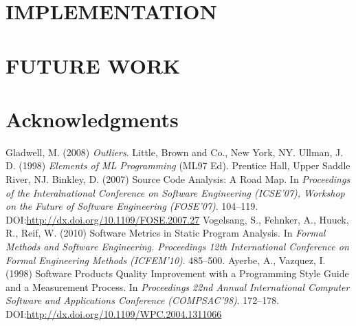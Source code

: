 \documentclass[12pt,abstracton]{scrartcl}
\begin{document}
\section{IMPLEMENTATION}\label{sec:impl}
\section{FUTURE WORK}\label{sec:future}
\section*{Acknowledgments}
\begin{thebibliography}{99}
 Gladwell, M. (2008) \emph{Outliers}. Little, Brown and Co., New York, NY.
 Ullman, J.\,D. (1998) \emph{Elements of ML Programming} (ML97 Ed). Prentice Hall, Upper Saddle River, NJ.
 Binkley, D. (2007) Source Code Analysis: A Road Map. In \emph{Proceedings of the Interalnational Conference on Software Engineering (ICSE'07), Workshop on the Future of Software Engineering (FOSE'07)}. 104--119. DOI:\url{http://dx.doi.org/10.1109/FOSE.2007.27}
 Vogelsang, S., Fehnker, A., Huuck, R., Reif, W. (2010) Software Metrics in Static Program Analysis. In \emph{Formal Methods and Software Engineering. Proceedings 12th International Conference on Formal Engineering Methods (ICFEM'10)}. 485--500.
 Ayerbe, A., Vazquez, I. (1998) Software Products Quality Improvement with a Programming Style Guide and a Measurement Process. In \emph{Proceedings
22nd Annual International Computer Software and Applications Conference (COMPSAC'98)}. 172--178. DOI:\url{http://dx.doi.org/10.1109/WPC.2004.1311066}
\end{thebibliography}
\end{document}
